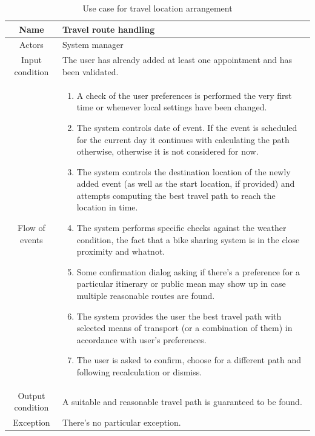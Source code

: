 \begin{table}
\centering
	\begin{tabular}{|c||p{}|}
		\hline
		Name & Travel route handling \\ \hline
		Actors & System manager \\ \hline
		Input condition & The user has already added at least one appointment and has been validated. \\ \hline
		Flow of events & \begin{enumerate}
			\item A check of the user preferences is performed the very first time or whenever local settings have been changed.
            \item The system controls date of event. If the event is scheduled for the current day it continues with calculating the path otherwise, otherwise it is not considered for now.
            \item The system controls the destination location of the newly added event (as well as the start location, if provided) and attempts computing the best travel path to reach the location in time.
			\item The system performs specific checks against the weather condition, the fact that a bike sharing system is in the close proximity and whatnot.
            \item Some confirmation dialog asking if there's a preference for a particular itinerary or public mean may show up in case multiple reasonable routes are found.
            \item The system provides the user the best travel path with selected means of transport (or a combination of them) in accordance with user's preferences.
            \item The user is asked to confirm, choose for a different path and following recalculation or dismiss.
		\end{enumerate} \\ \hline
		Output condition & A suitable and reasonable travel path is guaranteed to be found. \\ \hline
		Exception & There's no particular exception.  \\ \hline		
	\end{tabular}
\caption{Use case for travel location arrangement}
\label{usecase_travel_location}
\end{table}


